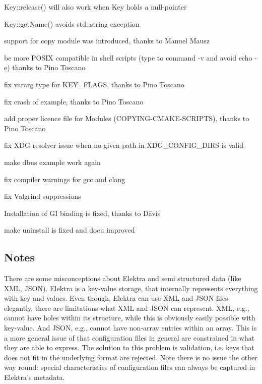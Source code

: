 \begin{DoxyItemize}
\item Key\+::release() will also work when Key holds a null-\/pointer
\item Key\+::get\+Name() avoids std\+::string exception
\item support for copy module was introduced, thanks to Manuel Mausz
\item be more P\+O\+S\+IX compatible in shell scripts ({\ttfamily type} to {\ttfamily command -\/v} and avoid {\ttfamily echo -\/e}) thanks to Pino Toscano
\item fix vararg type for K\+E\+Y\+\_\+\+F\+L\+A\+GS, thanks to Pino Toscano
\item fix crash of example, thanks to Pino Toscano
\item add proper licence file for Modules (C\+O\+P\+Y\+I\+N\+G-\/\+C\+M\+A\+K\+E-\/\+S\+C\+R\+I\+P\+TS), thanks to Pino Toscano
\item fix X\+DG resolver issue when no given path in X\+D\+G\+\_\+\+C\+O\+N\+F\+I\+G\+\_\+\+D\+I\+RS is valid
\item make dbus example work again
\item fix compiler warnings for gcc and clang
\item fix Valgrind suppressions
\item Installation of GI binding is fixed, thanks to Dāvis
\item make uninstall is fixed and docu improved
\end{DoxyItemize}

\subsection*{Notes}

There are some misconceptions about Elektra and semi structured data (like X\+ML, J\+S\+ON). Elektra is a key-\/value storage, that internally represents everything with key and values. Even though, Elektra can use X\+ML and J\+S\+ON files elegantly, there are limitations what X\+ML and J\+S\+ON can represent. X\+ML, e.\+g., cannot have holes within its structure, while this is obviously easily possible with key-\/value. And J\+S\+ON, e.\+g., cannot have non-\/array entries within an array. This is a more general issue of that configuration files in general are constrained in what they are able to express. The solution to this problem is validation, i.\+e. keys that does not fit in the underlying format are rejected. Note there is no issue the other way round\+: special characteristics of configuration files can always be captured in Elektra’s metadata.

